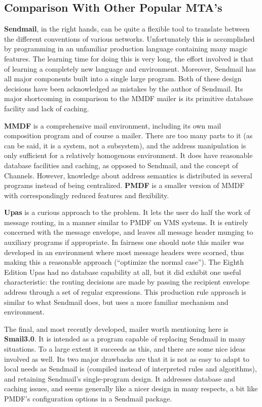 \subsection{Comparison With Other Popular MTA's}

{\bf Sendmail}, in the right hands, can be quite a flexible tool to translate
between the different conventions of various networks.  Unfortunately this
is accomplished by programming in an unfamiliar production language
containing many magic features.  The learning time for doing this is very
long, the effort involved is that of learning a completely new language and
environment. Moreover, Sendmail has all major components built into a
single large program. Both of these design decisions have been acknowledged
as mistakes by the author of Sendmail.  Its major shortcoming in comparison
to the MMDF mailer is its primitive database facility and lack of caching.

{\bf MMDF} is a comprehensive mail environment, including its own mail
composition program and of course a mailer.  There are too many parts to it
(as can be said, it is a system, not a subsystem), and the address
manipulation is only sufficient for a relatively homogenous environment. It
does have reasonable database facilities and caching, as opposed to
Sendmail, and the concept of Channels.  However, knowledge about address
semantics is distributed in several programs instead of being centralized.
{\bf PMDF} is a smaller version of MMDF with correspondingly reduced features and
flexibility.

{\bf Upas} is a curious approach to the problem. It lets the user do half the
work of message routing, in a manner similar to PMDF on VMS systems. It is
entirely concerned with the message envelope, and leaves all message header
munging to auxiliary programs if appropriate. In fairness one should note
this mailer was developed in an environment where most message headers were
scorned, thus making this a reasonable approach (``optimize the normal
case''). The Eighth Edition Upas had no database capability at all, but it
did exhibit one useful characteristic: the routing decisions are made by
passing the recipient envelope address through a set of regular
expressions. This production rule approach is similar to what Sendmail
does, but uses a more familiar mechanism and environment.

The final, and most recently developed, mailer worth mentioning here is
{\bf Smail3.0}.
It is intended as a program capable of replacing Sendmail in many
situations. To a large extent it succeeds as this, and there are some nice
ideas involved as well. Its two major drawbacks are that it is not as easy
to adapt to local needs as Sendmail is (compiled instead of interpreted
rules and algorithms), and retaining Sendmail's single-program design.  It
addresses database and caching issues, and seems generally like a nicer
design in many respects, a bit like PMDF's configuration options in a
Sendmail package.

